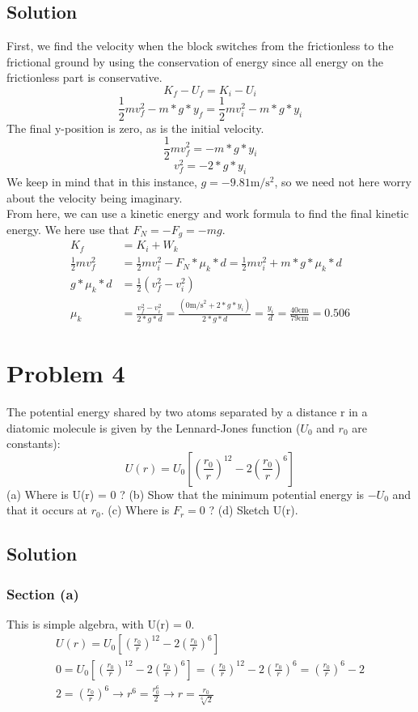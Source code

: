 \documentclass[12pt]{article}
\begin{document}
\subsection*{Solution}
First, we find the velocity when the block switches from the frictionless to the frictional ground by using the conservation of energy since all energy on the frictionless part is conservative.
\[ K_f - U_f = K_i - U_i \]
\[ \frac{1}{2}mv_f^2 - m*g*y_f = \frac{1}{2}mv_i^2 - m*g*y_i \]
The final y-position is zero, as is the initial velocity.
\[ \frac{1}{2}mv_f^2 = -m*g*y_i \]
\[ v_f^2 = -2*g*y_i \]
We keep in mind that in this instance, $ g = -9.81\unit{\meter/\second^2} $, so we need not here worry about the velocity being imaginary.\\
From here, we can use a kinetic energy and work formula to find the final kinetic energy. We here use that $F_N = -F_g = -mg$.
\begin{align*}
    K_f &=  K_i + W_k\\
    \frac{1}{2}mv_f^2   &=  \frac{1}{2}mv_i^2 - F_N * \mu_k * d
        =   \frac{1}{2}mv_i^2 + m * g * \mu_k * d\\
    g * \mu_k * d   &= \frac{1}{2}(v_f^2 - v_i^2)\\
    \mu_k   &=  \frac{v_f^2 - v_i^2}{2*g*d}
            =   \frac{(0\unit{\meter/\second}^2 + 2*g*y_i)}{2*g*d}
            =   \frac{y_i}{d} = \frac{40\unit{\centi\meter}}{79\unit{\centi\meter}}
            =   \boxed{0.506}
\end{align*}

\pagebreak
\section*{Problem 4}
The potential energy shared by two atoms separated by a distance r in a diatomic molecule is given by the
Lennard-Jones function ($U_0$ and $r_0$ are constants):
\[ U(r) = U_0\left[ \left(\frac{r_0}{r}\right)^{12} - 2\left(\frac{r_0}{r}\right)^{6} \right] \]
(a) Where is U(r) = 0 ? (b) Show that the minimum potential energy is $-U_0$ and that it occurs at $r_0$. (c)
Where is $F_r = 0$ ? (d) Sketch U(r).

\subsection*{Solution}
\subsubsection*{Section (a)}
This is simple algebra, with U(r) = 0.
\begin{gather*}
    U(r) = U_0\left[ \left(\frac{r_0}{r}\right)^{12} - 2\left(\frac{r_0}{r}\right)^{6} \right]\\
    0   =   U_0\left[ \left(\frac{r_0}{r}\right)^{12} - 2\left(\frac{r_0}{r}\right)^{6} \right]
        =   \left(\frac{r_0}{r}\right)^{12} - 2\left(\frac{r_0}{r}\right)^{6}
        =   \left(\frac{r_0}{r}\right)^{6} - 2\\
    2   =   \left(\frac{r_0}{r}\right)^{6}\rightarrow
    r^6 =   \frac{r_0^6}{2}\rightarrow
    \boxed{ r   =   \frac{r_0}{\sqrt[6]{2}} }
\end{gather*}
\end{document}
